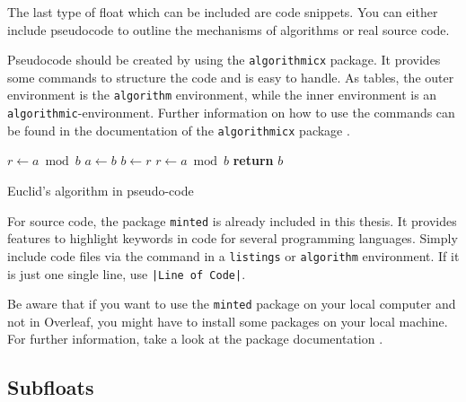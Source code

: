 \documentclass[
    language=german, %
    thesis=bachelor, %
    supervisor=postdoc, %
    multiauthor=false, %
    ]{settings/csssa-thesis}
\begin{document}
The last type of float which can be included are code snippets. You can either include pseudocode to outline the mechanisms of algorithms or real source code.

Pseudocode should be created by using the \texttt{algorithmicx} package. It provides some commands to structure the code and is easy to handle. As tables, the outer environment is the \texttt{algorithm} environment, while the inner environment is an \texttt{algorithmic}-environment. Further information on how to use the commands can be found in the documentation of the \texttt{algorithmicx} package \citep{Janos2020algorithmicx}.

\begin{algorithm}
    \begin{algorithmic}[1]
         
        \State $r\gets a\bmod b$
              \State $a\gets b$
              \State $b\gets r$
              \State $r\gets a\bmod b$
           \EndWhile\label{euclidendwhile}
           \State \textbf{return} $b$
        \EndProcedure
    \end{algorithmic}
    \caption{Euclid’s algorithm in pseudo-code}\label{ch02:code:pseudo-euclid}
\end{algorithm}

For source code, the package \texttt{minted} is already included in this thesis. It provides features to highlight keywords in code for several programming languages. Simply  include code files via the  command in a \texttt{listings} or \texttt{algorithm} environment. If it is just one single line, use \texttt{|Line of Code|}.

Be aware that if you want to use the \texttt{minted} package on your local computer and not in Overleaf, you might have to install some packages on your local machine. For further information, take a look at the package documentation \citep{Poore2020minted}.\label{ch02:sec3:minted}


\subsection{Subfloats}
\end{document}
